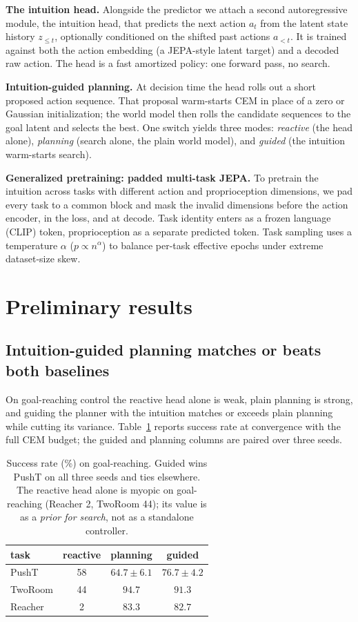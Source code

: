 \documentclass[11pt]{article}
\begin{document}
\textbf{The intuition head.} Alongside the predictor we attach a second autoregressive module, the
intuition head, that predicts the next action $a_t$ from the latent state history $z_{\le t}$,
optionally conditioned on the shifted past actions $a_{<t}$. It is trained against both the action
embedding (a JEPA-style latent target) and a decoded raw action. The head is a fast amortized
policy: one forward pass, no search.

\textbf{Intuition-guided planning.} At decision time the head rolls out a short proposed action
sequence. That proposal warm-starts CEM in place of a zero or Gaussian initialization; the world
model then rolls the candidate sequences to the goal latent and selects the best. One switch yields
three modes: \emph{reactive} (the head alone), \emph{planning} (search alone, the plain world
model), and \emph{guided} (the intuition warm-starts search).

\textbf{Generalized pretraining: padded multi-task JEPA.} To pretrain the intuition across tasks with
different action and proprioception dimensions, we pad every task to a common block and mask the
invalid dimensions before the action encoder, in the loss, and at decode. Task identity enters as a
frozen language (CLIP) token, proprioception as a separate predicted token. Task sampling uses a
temperature $\alpha$ ($p \propto n^{\alpha}$) to balance per-task effective epochs under extreme
dataset-size skew.

\section{Preliminary results}

\subsection{Intuition-guided planning matches or beats both baselines}
On goal-reaching control the reactive head alone is weak, plain planning is strong, and guiding the
planner with the intuition matches or exceeds plain planning while cutting its variance. Table~\ref{tab:modes}
reports success rate at convergence with the full CEM budget; the guided and planning columns are
paired over three seeds.

\begin{table}[h]
\centering
\small
\begin{tabular}{lccc}
\toprule
task & reactive & planning & guided \\
\midrule
PushT   & 58   & $64.7\pm6.1$ & $\mathbf{76.7\pm4.2}$ \\
TwoRoom & 44   & $\mathbf{94.7}$ & $91.3$ \\
Reacher & 2    & $\mathbf{83.3}$ & $82.7$ \\
\bottomrule
\end{tabular}
\caption{Success rate (\%) on goal-reaching. Guided wins PushT on all three seeds and ties elsewhere.
The reactive head alone is myopic on goal-reaching (Reacher 2, TwoRoom 44); its value is as a
\emph{prior for search}, not as a standalone controller.}
\label{tab:modes}
\end{table}
\end{document}
